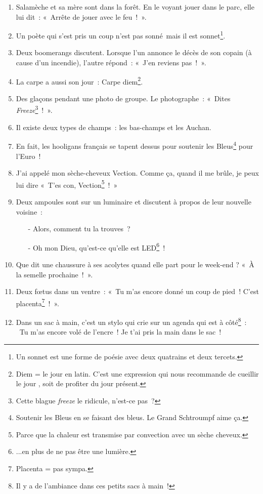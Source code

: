 \documentclass[10pt,a5paper,fullpage]{book}
\begin{document}
\begin{enumerate}
		\item Salamèche et sa mère sont dans la forêt. En le voyant jouer dans le parc, elle lui dit~: «~Arrête de jouer avec le feu~!~».			
		\item Un poète qui s'est pris un coup n'est pas sonné mais il est sonnet\footnote{Un sonnet est une forme de poésie avec deux quatrains et deux tercets.}.
		\item Deux boomerangs discutent. Lorsque l’un annonce le décès de son copain (à cause d’un incendie), l’autre répond~: «~J’en reviens pas~!~».
		\item La carpe a aussi son jour~: Carpe diem\footnote{Diem = le jour en latin. C'est une expression qui nous recommande de \guillemotleft cueillir le jour \guillemotright, soit de profiter du jour présent.}.
		\item Des glaçons pendant une photo de groupe. Le photographe~: « Dites \textit{Freeze}\footnote{Cette blague \textit{freeze} le ridicule, n'est-ce pas~?}~! ».
		\item Il existe deux types de champs~: les bas-champs et les Auchan.
		\item En fait, les hooligans français se tapent dessus pour soutenir les Bleus\footnote{Soutenir les Bleus en se faisant des bleus. Le Grand Schtroumpf aime ça.} pour l’Euro~!
		\item J’ai appelé mon sèche-cheveux Vection. Comme ça, quand il me brûle, je peux lui dire « T’es con, Vection\footnote{Parce que la chaleur est transmise par convection avec un sèche cheveux.}~! »
		\item Deux ampoules sont sur un luminaire et discutent à propos de leur nouvelle voisine~:
		\begin{itemize}
			\item[-] Alors, comment tu la trouves~?
			\item[-] Oh mon Dieu, qu’est-ce qu’elle est LED\footnote{...en plus de ne pas être une lumière.}~!
		\end{itemize}
		\item Que dit une chaussure à ses acolytes quand elle part pour le week-end ? «~À la semelle prochaine~!~».		
		\item Deux fœtus dans un ventre~: « Tu m’as encore donné un coup de pied~! C’est placenta\footnote{Placenta = pas sympa.}~!~».
		\item Dans un sac à main, c'est un stylo qui crie sur un agenda qui est à côté\footnote{Il y a de l'ambiance dans ces petits sacs à main~!}~: \guillemotleft~Tu m’as encore volé de l’encre~! Je t’ai pris la main dans le sac~!~\guillemotright

\end{enumerate}
\end{document}
